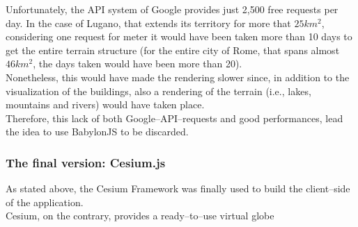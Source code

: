 Unfortunately, the API system of Google provides just 2,500 free requests per day. In the case of Lugano, that extends its territory for more that $25km^2$, considering one request for meter it would have been taken more than 10 days to get the entire terrain structure (for the entire city of Rome, that spans almost $46km^2$, the days taken would have been more than 20).\\

Nonetheless, this would have made the rendering slower since, in addition to the visualization of the buildings, also a rendering of the terrain (i.e., lakes, mountains and rivers) would have taken place.\\
Therefore, this lack of both Google--API--requests and good performances, lead the idea to use BabylonJS to be discarded.
\subsubsection{The final version: Cesium.js}
As stated above, the Cesium Framework was finally used to build the client--side of the application.\\
Cesium, on the contrary, provides a ready--to--use virtual globe
